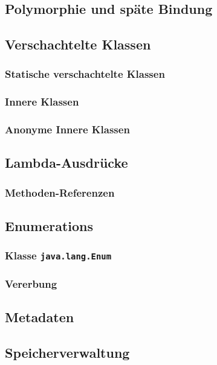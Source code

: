 \subsection{Polymorphie und späte Bindung}
	

\subsection{Verschachtelte Klassen}
	
	\subsubsection{Statische verschachtelte Klassen}
	
	\subsubsection{Innere Klassen}
	
	\subsubsection{Anonyme Innere Klassen}

\subsection{Lambda-Ausdrücke}
	
	\subsubsection{Methoden-Referenzen}

\subsection{Enumerations}
	
	\subsubsection{Klasse \texttt{java.lang.Enum}}
	
	\subsubsection{Vererbung}

\subsection{Metadaten}
	

\subsection{Speicherverwaltung}
